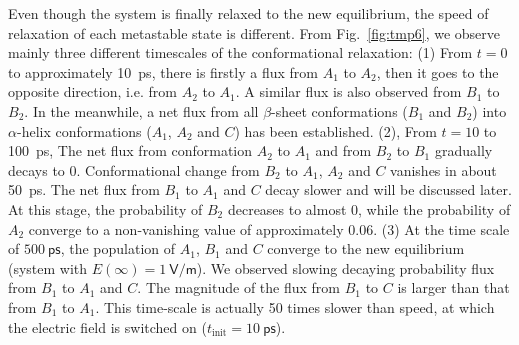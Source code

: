 \documentclass[aip,jcp,a4paper,preprint,onecolumn]{revtex4-1}
\begin{document}
Even though the system is finally relaxed to the new equilibrium,
the speed of relaxation of each metastable state is different. 
From Fig.~\ref{fig:tmp6}, we observe mainly
three different timescales of the conformational relaxation:
(1) From
$t=0$ to approximately 10~\textsf{ps}, there is firstly
a flux from $A_1$ to $A_2$, then it goes to the opposite direction, i.e.
from $A_2$ to $A_1$.
A similar flux is also observed from $B_1$ to $B_2$.
In the meanwhile, a net flux from all $\beta$-sheet conformations
($B_1$ and $B_2$) into $\alpha$-helix conformations ($A_1$, $A_2$ and
$C$) has been established.
(2), From $t=10$ to
100~\textsf{ps},
The net flux from  conformation $A_2$ to $A_1$ and from $B_2$ to $B_1$
gradually decays to 0. Conformational change from $B_2$ to $A_1$, $A_2$ and $C$
vanishes in about 50~ps.
The net flux from $B_1$  to $A_1$ and $C$ decay slower and 
will be discussed later.
At this stage, the probability of $B_2$ decreases to almost 0,
while the probability of $A_2$
converge to a non-vanishing value of approximately 0.06.
(3) At the time scale of $
500~\textsf{ps}$, the population of $A_1$, $B_1$ and $C$ converge to
the new equilibrium (system with $E(\infty) = 1~\textsf{V/m}$).
We observed slowing decaying probability flux from $B_1$ 
to $A_1$ and $C$.
The magnitude of the flux from $B_1$ to  $C$ is larger than that from  $B_1$ to  $A_1$.
This time-scale is actually 50 times slower than speed, at which
the electric field is switched on ($t_{\textrm{init}} = 10~\textsf{ps}$).
\end{document}
